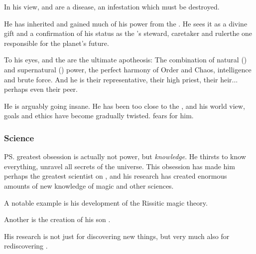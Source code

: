 In his view, \resphain{} and \humans{} are a disease, an infestation which must be destroyed. 


He has inherited and gained much of his power from the \firstgendragons. He sees it as a divine gift and a confirmation of his status as the \Miith{}'s steward, caretaker and ruler\dash the one responsible for the planet's future. 

To his eyes, \Tiamat{} and the \firstgendragons{} are the ultimate apotheosis: The combination of natural (\ophidian) and supernatural (\xzaishannic) power, the perfect harmony of Order and Chaos, intelligence and brute force. And he is their representative, their high priest, their heir... perhaps even their peer. 


He is arguably going insane. 
He has been too close to the \xss, and his world view, goals and ethics have become gradually twisted. 
\Nzessuacrith{} fears for him. 





\subsubsection{Science}
\ps{\Secherdamon} greatest obsession is actually not power, but \emph{knowledge}. He thirsts to know everything, unravel all secrets of the universe. This obsession has made him perhaps the greatest scientist on \Miith{}, and his research has created enormous amounts of new knowledge of magic and other sciences. 

A notable example is his development of the Rissitic magic theory. 

Another is the creation of his son .

His research is not just for discovering new things, but very much also for rediscovering . 

